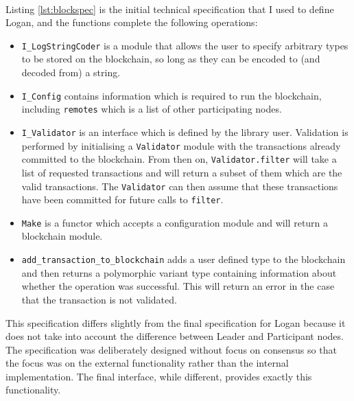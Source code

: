\documentclass[12pt,a4paper,twoside,openright]{report}
\begin{document}
	\\
	Listing \ref{lst:blockspec} is the initial technical specification that I used to define Logan, and the functions complete the following operations:
	\begin{itemize}
		\item \texttt{I\_LogStringCoder} is a module that allows the user to specify arbitrary types to be stored on the blockchain, so long as they can be encoded to (and decoded from) a string.
		\item \texttt{I\_Config} contains information which is required to run the blockchain, including \texttt{remotes} which is a list of other participating nodes.
		\item \texttt{I\_Validator} is an interface which is defined by the library user. 
			Validation is performed by initialising a \texttt{Validator} module with the transactions already committed to the blockchain.
			From then on, \texttt{Validator.filter} will take a list of requested transactions and will return a subset of them which are the valid transactions.
			The \texttt{Validator} can then assume that these transactions have been committed for future calls to \texttt{filter}.
		\item \texttt{Make} is a functor which accepts a configuration module and will return a blockchain module.
		\item \texttt{add\_transaction\_to\_blockchain} adds a user defined type to the blockchain and then returns a polymorphic variant type containing information about whether the operation was successful. 
			This will return an error in the case that the transaction is not validated.
	\end{itemize} 
	This specification differs slightly from the final specification for Logan because it does not take into account the difference between Leader and Participant nodes.
	The specification was deliberately designed without focus on consensus so that the focus was on the external functionality rather than the internal implementation. 
	The final interface, while different, provides exactly this functionality.
\end{document}
